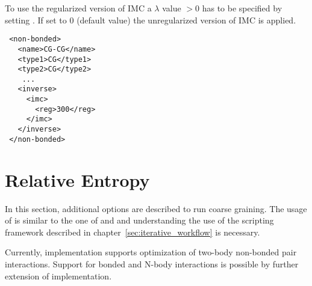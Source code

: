 To use the regularized version of IMC a $\lambda$ value $>0$ has to be specified by setting . 
If set to $0$ (default value) the unregularized version of IMC is applied.
\begin{lstlisting}
 <non-bonded>
   <name>CG-CG</name>
   <type1>CG</type1>
   <type2>CG</type2>
    ...
   <inverse>
     <imc>
       <reg>300</reg>
     </imc>
   </inverse>
 </non-bonded>
\end{lstlisting}

\section{Relative Entropy}
\label{sec:iterative_methods_re}
In this section, additional options are described to run \re coarse
graining. The usage of \re is similar to the one of \ibi and \imc and
understanding the use of the scripting framework described in
chapter~\ref{sec:iterative_workflow} is necessary.

Currently, \re implementation supports optimization of two-body
non-bonded pair interactions. Support for bonded and N-body interactions is
possible by further extension of \re implementation.

